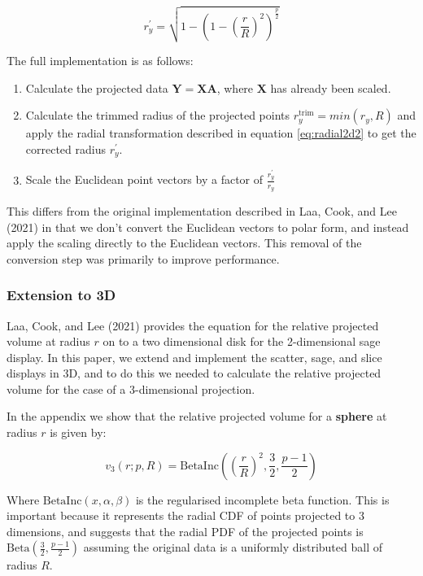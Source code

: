 \begin{equation}
r_y^\prime = \sqrt{1 - \left(1-\left(\frac{r}{R}\right)^2\right)^\frac{p}{2}}
\label{eq:radial2d2}
\end{equation}

The full implementation is as follows:

\begin{enumerate}
\def\labelenumi{\arabic{enumi}.}
\tightlist
\item
  Calculate the projected data \(\mathbf{Y} = \mathbf{XA}\), where \(\mathbf{X}\) has already been scaled.
\item
  Calculate the trimmed radius of the projected points \(r_y^\mathrm{trim} = min(r_y, R)\) and apply the radial transformation described in equation \eqref{eq:radial2d2} to get the corrected radius \(r_y^\prime\).
\item
  Scale the Euclidean point vectors by a factor of \(\frac{r_y^\prime}{r_y}\)
\end{enumerate}

This differs from the original implementation described in Laa, Cook, and Lee (2021) in that we don't convert the Euclidean vectors to polar form, and instead apply the scaling directly to the Euclidean vectors. This removal of the conversion step was primarily to improve performance.

\hypertarget{extension-to-3d}{%
\subsubsection{Extension to 3D}\label{extension-to-3d}}

Laa, Cook, and Lee (2021) provides the equation for the relative projected volume at radius \(r\) on to a two dimensional disk for the 2-dimensional sage display. In this paper, we extend and implement the scatter, sage, and slice displays in 3D, and to do this we needed to calculate the relative projected volume for the case of a 3-dimensional projection.

In the appendix we show that the relative projected volume for a \textbf{sphere} at radius \(r\) is given by:

\begin{equation}
  v_3(r; p, R) = \mathrm{BetaInc}\left(\left(\frac{r}{R}\right)^2, \frac{3}{2}, \frac{p-1}{2}\right) 
\end{equation}

Where \(\mathrm{BetaInc}(x, \alpha, \beta)\) is the regularised incomplete beta function. This is important because it represents the radial CDF of points projected to 3 dimensions, and suggests that the radial PDF of the projected points is \(\mathrm{Beta}\left(\frac{3}{2}, \frac{p-1}{2}\right)\) assuming the original data is a uniformly distributed ball of radius \(R\).

